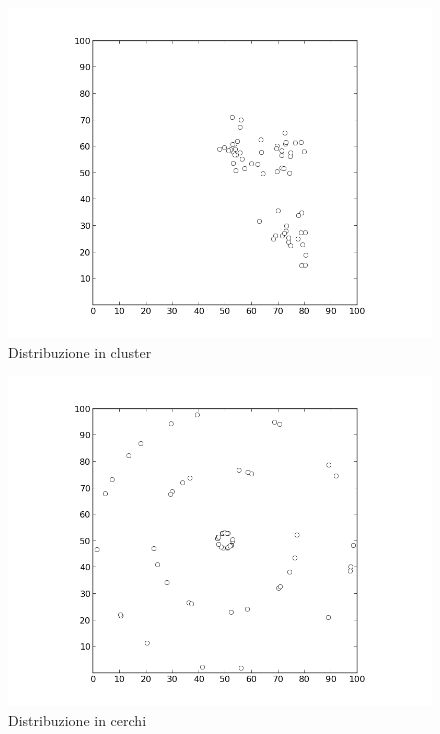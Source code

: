 \documentclass[preprint,12pt]{elsarticle}
\begin{document}
\begin{figure}[htbp]
\centering
\includegraphics[scale=0.50]{grafici_istanze/cluster_60.png} 
\caption{Distribuzione in cluster}\label{fig:2}
\end{figure}

\begin{figure}[htbp]
\centering
\includegraphics[scale=0.50]{grafici_istanze/circle_60.png} 
\caption{Distribuzione in cerchi}\label{fig:3}
\end{figure}
\end{document}
